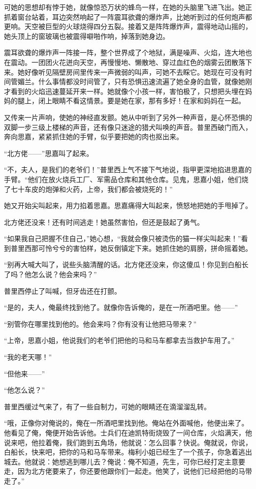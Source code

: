 \par 可她的思想却有悖于她，就像惊恐万状的蜂鸟一样，在她的头脑里飞进飞出。她正抓着窗台站着，耳边突然响起了一阵震耳欲聋的爆炸声，比她听到过的任何炮声都更响。天空被巨型的火球烧得四分五裂。接着又是阵阵爆炸声，震得地动山摇的，她头顶上的窗玻璃也被震得噼啪作响，掉落到她身边。
\par 震耳欲聋的爆炸声一阵接一阵，整个世界成了个地狱，满是噪声、火焰，连大地也在震动。一团团火花迸向天空，再慢慢地、懒散地、穿过血红色的烟雾云团散落下来。她好像听见隔壁房间里传来一声微弱的叫声，可她不去睬它。她现在可没有时间管媚兰。什么事情都没时间管了，只有恐惧迅速流遍了她全身的血管，就像她刚才看到的火焰迅速蔓延开来一样。她就像个小孩一样，害怕极了，只想把头埋在妈妈的腿上，闭上眼睛不看这情景。要是她在家，那有多好！在家和妈妈在一起。
\par 又传来一片声响，使她的神经直发颤。她从中听到了另外一种声音，是心怀恐惧的双脚一步三级上楼梯的声音，还有像只迷途的猎犬叫唤的声音。普里西破门而入，奔向思嘉，紧紧抓住她的手臂，似乎要把她的肉也抠出来。
\par “北方佬——”思嘉叫了起来。
\par “不，夫人，是我们的老爷们！”普里西上气不接下气地说，指甲更深地掐进思嘉的手臂。“他们在放火烧兵工厂、军需品仓库和其他仓库。见鬼，思嘉小姐，他们烧了七十车皮的炮弹和火药，上帝，我们都会被烧死的！”
\par 她又开始尖叫起来，用力掐着思嘉。思嘉痛得大叫起来，愤怒地把她的手甩掉了。
\par 北方佬还没来！还有时间逃走！她虽然害怕，但还是鼓起了勇气。
\par “如果我自己把握不住自己，”她心想，“我就会像只被烫伤的猫一样尖叫起来！”看到普里西那可怜兮兮的害怕样，她反倒镇定下来。她抓住她的肩膀，拼命摇着她。
\par “别再大喊大叫了，说些头脑清醒的话。北方佬还没来，你这傻瓜！你见到白船长了吗？他怎么说？他会来吗？”
\par 普里西停止了叫喊，但牙齿还在打颤。
\par “是的，夫人，俺最终找到他了。就像你告诉俺的，是在一所酒吧里。他——”
\par “别管你在哪里找到他的。他会来吗？你有没有让他把马带来？”
\par “上帝，思嘉小姐，他说我们的老爷们把他的马和马车都拿去当救护车用了。”
\par “我的老天哪！”
\par “但他来——”
\par “他怎么说？”
\par 普里西缓过气来了，有了一些自制力，可她的眼睛还在滴溜溜乱转。
\par “哦，正像你对俺说的，俺在一所酒吧里找到他。俺站在外面喊他，他便出来了。他看见了俺，俺便开始告诉他。士兵们在迪凯特街烧毁了一间仓库，火焰满天，他说来吧，他拉着俺，我们跑到五角场，他就说：怎么回事？快说。俺就说，你说，白船长，快来吧，把你的马和马车带来。梅利小姐已经生了一个孩子，你急着逃出城去。他就说：她想逃到哪儿去？俺说：俺不知道，先生，可你已经打定主意要走，因为北方佬要来了，你还要他跟你们一起走。他笑了，说他们已经把他的马带走了。”
